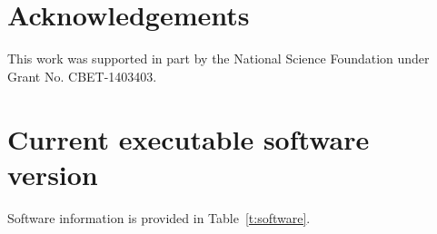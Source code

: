 \documentclass[preprint,12pt, a4paper]{elsarticle}
\begin{document}
\section*{Acknowledgements}
\label{acknowledgements}

This work was supported in part by the National Science Foundation under Grant No. CBET-1403403.





 
 

\section*{Current executable software version}
\label{software_version}

Software information is provided in Table~\ref{t:software}.

\end{document}
